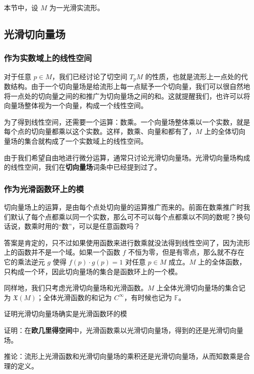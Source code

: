 


本节中，设 $M$ 为一光滑实流形。

\subsection{光滑切向量场}

\subsubsection{作为实数域上的线性空间}

对于任意 $p\in M$，我们已经讨论了切空间 $T_pM$ 的性质，也就是流形上一点处的代数结构。由于一个切向量场是给流形上每一点赋予一个切向量，我们可以很自然地将一点处的切向量之间的和推广为切向量场之间的和。这就提醒我们，也许可以将向量场整体视为一个向量，构成一个线性空间。

为了得到线性空间，还需要一个运算：数乘。一个向量场整体乘以一个实数，就是每个点的切向量都乘以这个实数。这样，数乘、向量和都有了，$M$ 上的全体切向量场的集合就构成了一个实数域上的线性空间。

由于我们希望自由地进行微分运算，通常只讨论光滑切向量场。光滑切向量场构成的线性空间，我们在\textbf{切向量场}词条中已经提到过了。

\subsubsection{作为光滑函数环上的模}

切向量场上的运算，是由每个点处切向量的运算推广而来的。前面在数乘推广时我们默认了每个点都乘以同一个实数，那么可不可以每个点都乘以不同的数呢？换句话说，数乘时用的“数”，可以是任意函数吗？

答案是肯定的，只不过如果使用函数来进行数乘就没法得到线性空间了，因为流形上的函数并不是一个域。如果一个函数 $f$ 不恒为零，但是有零点，那么就不存在它的乘法逆元 $g$ 使得 $f(p)\cdot g(p)=1$ 对任意 $p\in M$ 成立。$M$ 上的全体函数，只构成一个环，因此切向量场的集合是函数环上的一个模。

同样地，我们只考虑光滑切向量场和光滑函数。$M$ 上全体光滑切向量场的集合记为 $\mathfrak{X}(M)$；全体光滑函数的和记为 $C^{\infty}$，有时候也记为 $\mathbb{F}$。

\begin{exercise}{证明光滑切向量场确实是光滑函数环的模}

证明：在\textbf{欧几里得空间}中，光滑函数乘以光滑切向量场，得到的还是光滑切向量场。

推论：流形上光滑函数和光滑切向量场的乘积还是光滑切向量场，从而知数乘是合理的定义。

\end{exercise}


